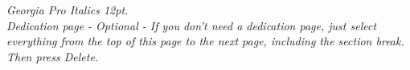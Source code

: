 \textit{Georgia Pro Italics 12pt.\\
Dedication page - Optional - If you don’t need a dedication page, just select everything from the top of this page to the next page, including the section break. Then press Delete.}
